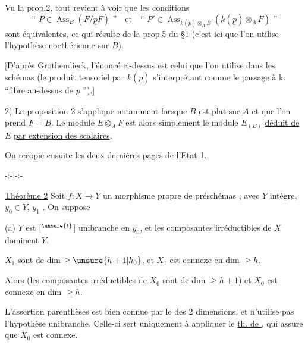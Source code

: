 Vu la prop.2, tout revient à voir que les conditions
\[
\text{`` }\underline P\in\operatorname{Ass}_B(F/\underline pF)\text{ ''}\quad\text{et}\quad
\text{`` }\underline{P'}\in\operatorname{Ass}_{k(\underline p)\otimes_A B}(k(\underline p)\otimes_A F)\text{ ''}
\]
sont équivalentes, ce qui résulte de la prop.5 du §1 (c'est ici que l'on
utilise l'hypothèse noethérienne sur $B$).

[D'après Grothendieck, l'énoncé ci-dessus est celui que l'on utilise dans
les schémas (le produit tensoriel par $k(\underline p)$ s'interprétant comme le passage
à la ``fibre au-dessus de $\underline p$ '').]

2) La proposition 2 s'applique notamment lorsque $B$ \uline{est plat sur} $A$ et que
l'on prend $F=B$. Le module $E\otimes_A F$ est alors simplement le module $E_{(B)}$
\uline{déduit de} $E$ \uline{par extension des scalaires}.

On recopie ensuite les deux dernières pages de l'Etat 1.

\begin{center}-:-:-:-\end{center}

\uline{Théorème 2} Soit $f:X\longrightarrow Y$ un
morphisme  propre de
préschémas  , avec $Y$ intègre,
$y_0\in Y$, $y_1$ 
.
On suppose

 (a) $Y$ est [$^{\unsure{t}}$] unibranche en $y_0$,
et les composantes irréductibles de
$X$ dominent $Y$.

 \uline{$X_1$ sont} de dim $\geq\unsure{h+1|h_0}$, et $X_1$ est
connexe en dim $\geq h$.

Alors (les composantes irréductibles
de $X_0$ sont de dim $\geq h+1$) et
$X_0$ est \uline{connexe} en dim $\geq h$.

L'assertion  parenthèses est
bien connue par le  des 2
dimensions, et n'utilise pas l'hypothèse
unibranche. Celle-ci sert uniquement
à appliquer le \uline{th. de },
qui assure que $X_0$ est connexe.

